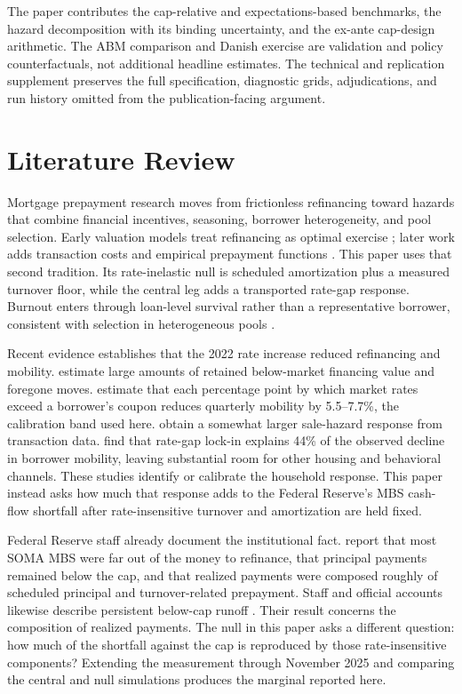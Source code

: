 \documentclass[12pt]{article}
\begin{document}
The paper contributes the cap-relative and expectations-based benchmarks, the
hazard decomposition with its binding uncertainty, and the ex-ante cap-design
arithmetic. The ABM comparison and Danish exercise are validation and policy
counterfactuals, not additional headline estimates. The technical and
replication supplement preserves the full specification, diagnostic grids,
adjudications, and run history omitted from the publication-facing argument.

\section{Literature Review}\label{sec:lit}

Mortgage prepayment research moves from frictionless refinancing toward hazards
that combine financial incentives, seasoning, borrower heterogeneity, and pool
selection. Early valuation models treat refinancing as optimal exercise
\citep{dunn1981}; later work adds transaction costs and empirical prepayment
functions \citep{schwartz1989,richard1989,stanton1995,agarwal2013}. This paper
uses that second tradition. Its rate-inelastic null is scheduled amortization
plus a measured turnover floor, while the central leg adds a transported
rate-gap response. Burnout enters through loan-level survival rather than a
representative borrower, consistent with selection in heterogeneous pools
\citep{chernov2018,lesniewski2026}.

Recent evidence establishes that the 2022 rate increase reduced refinancing and
mobility. \citet{batzer2024} estimate large amounts of retained below-market
financing value and foregone moves. \citet{liebersohn2024} estimate that each
percentage point by which market rates exceed a borrower's coupon reduces
quarterly mobility by 5.5--7.7\%, the calibration band used here.
\citet{graybill2026} obtain a somewhat larger sale-hazard response from
transaction data. \citet{aladangady2024} find that rate-gap lock-in explains
44\% of the observed decline in borrower mobility, leaving substantial room
for other housing and behavioral channels. These studies identify or calibrate
the household response. This paper instead asks how much that response adds to
the Federal Reserve's MBS cash-flow shortfall after rate-insensitive turnover
and amortization are held fixed.

Federal Reserve staff already document the institutional fact. \citet{na2024}
report that most SOMA MBS were far out of the money to refinance, that principal
payments remained below the cap, and that realized payments were composed
roughly of scheduled principal and turnover-related prepayment. Staff and
official accounts likewise describe persistent below-cap runoff
\citep{nyfed2022,perli2024,hammack2025}. Their result concerns the composition
of realized payments. The null in this paper asks a different question: how
much of the shortfall against the cap is reproduced by those rate-insensitive
components? Extending the measurement through November 2025 and comparing the
central and null simulations produces the marginal reported here.
\end{document}
